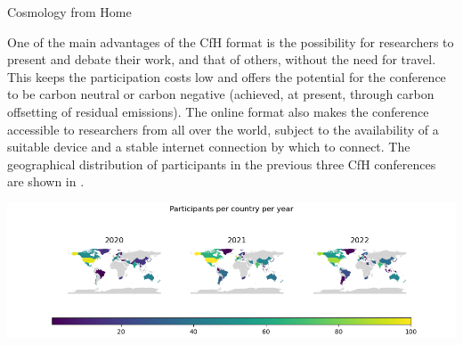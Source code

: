 \documentclass[../SustainableHEP.tex]{subfiles}
\begin{document}
\begin{casestudy}{Cosmology from Home}

One of the main advantages of the CfH format is the possibility for researchers to present and debate their work, and that of others, without the need for travel. This keeps the participation costs low and offers the potential for the conference to be carbon neutral or carbon negative (achieved, at present, through carbon offsetting of residual emissions).  The online format also makes the conference accessible to researchers from all over the world, subject to the availability of a suitable device and a stable internet connection by which to connect. The geographical distribution of participants in the previous three CfH conferences are shown in .



\begin{center}
    \centering
    \captionsetup{type=figure}
    \includegraphics[width=1.\textwidth]{Sections/Figs/Travel/map.png}
    \caption[Geographical distribution of CfH participants for each of the installments by year.]%
        {Geographical distribution of Cosmology from Home participants for each of the installments by year.\label{fig:CfH1}}
\end{center}



\end{casestudy}
\end{document}
